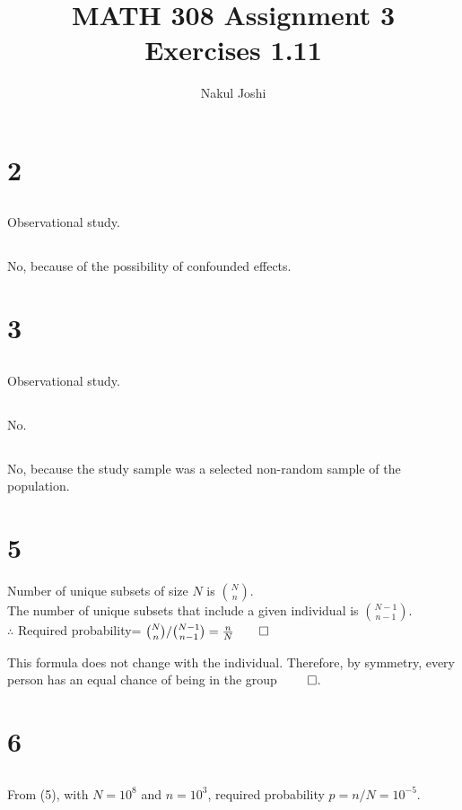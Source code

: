 \documentclass[twocolumn]{article}
\title{MATH 308 Assignment 3\\Exercises 1.11}
\author{Nakul Joshi}
\begin{document}
\maketitle

\section*{2}
\subsection{} Observational study.
\subsection{} No, because of the possibility of confounded effects.

\section*{3}
\subsection{} Observational study.
\subsection{} No.
\subsection{} No, because the study sample was a selected non-random sample of the population.

\section*{5}
Number of unique subsets of size $N$ is $\binom{N}{n}$.\\
The number of unique subsets that include a given individual is $\binom{N-1}{n-1}$.\\
$\therefore$ Required probability= $\binom{N}{n}/\binom{N-1}{n-1}=\frac{n}{N} \qed$

This formula does not change with the individual. Therefore, by symmetry, every person has an equal chance of being in the group $\qed$.

\section*{6}
\subsection{} From (5), with $N=10^8$ and $n=10^3$, required probability $p= n/N=10^{-5}$.
\end{document}
